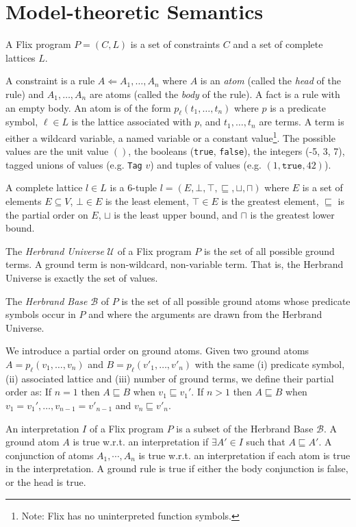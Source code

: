 \documentclass[10pt,twocolumn]{article}
\begin{document}
\section{Model-theoretic Semantics}

A Flix program $P = (C, L)$ is a set of constraints $C$ and a set of complete lattices $L$.

A constraint is a rule $A \Leftarrow A_1, \dots, A_n$ 
where $A$ is an \emph{atom} (called the \emph{head} of the rule) 
and $A_1, \dots, A_n$ are atoms (called the \emph{body} of the rule).
A fact is a rule with an empty body.
An atom is of the form $p_\ell(t_1, \dots, t_n)$ where 
$p$ is a predicate symbol,
$\ell \in L$ is the lattice associated with $p$, and
$t_1, \dots, t_n$ are terms. 
A term is either a wildcard variable, a named variable or a constant value\footnote{Note: Flix has no uninterpreted function symbols.}. 
The possible values are the unit value $()$, the booleans (\texttt{true}, \texttt{false}),
the integers (-5, 3, 7), tagged unions of values (e.g. \texttt{Tag} $v$) and 
tuples of values (e.g. $(1, \texttt{true}, 42)$).

A complete lattice $l \in L$ is a 6-tuple $l = (E, \bot, \top, \sqsubseteq, \sqcup, \sqcap)$ where 
$E$ is a set of elements $E \subseteq V$,
$\bot \in E$ is the least element,
$\top \in E$ is the greatest element,
$\sqsubseteq$ is the partial order on $E$,
$\sqcup$ is the least upper bound, and
$\sqcap$ is the greatest lower bound.

The \emph{Herbrand Universe} $\mathcal{U}$ of a Flix program $P$ is the set of all possible ground terms.
A ground term is non-wildcard, non-variable term. That is, the Herbrand Universe is exactly the set of values.

The \emph{Herbrand Base} $\mathcal{B}$ of $P$ is the set of all possible ground atoms whose
predicate symbols occur in $P$ and where the arguments are drawn from the Herbrand Universe.

We introduce a partial order on ground atoms. 
Given two ground atoms $A = p_\ell(v_1, \dots, v_n)$ and $B = p_\ell(v'_1, \dots, v'_n)$ with the same 
(i) predicate symbol, 
(ii) associated lattice and 
(iii) number of ground terms, we define their partial order as:
If $n = 1$ then $A \sqsubseteq B$ when $v_1 \sqsubseteq v_1'$.
If $n > 1$ then $A \sqsubseteq B$ when $v_1 = v_1', \dots, v_{n - 1} = v'_{n - 1}$ and $v_n \sqsubseteq v'_n$.

An interpretation $I$ of a Flix program $P$ is a subset of the Herbrand Base $\mathcal{B}$.
A ground atom $A$ is true w.r.t. an interpretation if $\exists A' \in I$ such that $A \sqsubseteq A'$. 
A conjunction of atoms $A_1, \cdots, A_n$ is true w.r.t. an interpretation if each atom is true in the interpretation.
A ground rule is true if either the body conjunction is false, or the head is true.
\end{document}
